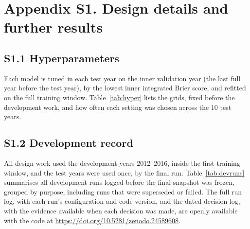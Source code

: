 \section*{Appendix S1. Design details and further results}
\setcounter{table}{0}
\renewcommand{\thetable}{S\arabic{table}}
\providecommand{\theHtable}{}\renewcommand{\theHtable}{S\arabic{table}} %

\subsection*{S1.1 Hyperparameters}
Each model is tuned in each test year on the inner validation year (the last full year before the
test year), by the lowest inner integrated Brier score, and refitted on the full training window.
Table~\ref{tab:hyper} lists the grids, fixed before the development work, and how often each
setting was chosen across the 10 test years.

{\small
\setlength{\LTpre}{0pt}
\begin{center}
\label{tab:hyper}\addtocounter{table}{-1}%
\end{center}
}

\subsection*{S1.2 Development record}
All design work used the development years 2012--2016, inside the first training window, and the
test years were used once, by the final run. Table~\ref{tab:devruns} summarises all \DevRunCount{} development runs logged before the final
snapshot was frozen, grouped by purpose, including runs that were superseded or failed. The full run log, with each run's configuration
and code version, and the dated decision log, with the evidence available when each decision was
made, are openly available with the code at \url{https://doi.org/10.5281/zenodo.24589608}.


